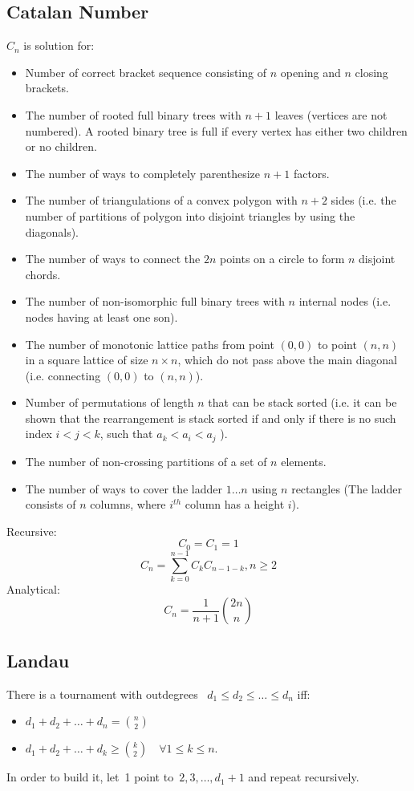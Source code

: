 \subsection{Catalan Number}
$C_n$ is solution for:
\begin{itemize}
	\item Number of correct bracket sequence consisting of $n$ opening and $n$ closing brackets.
	\item The number of rooted full binary trees with $n+1$ leaves (vertices are not numbered). A rooted binary tree is full if every vertex has either two children or no children.
	\item The number of ways to completely parenthesize $n+1$ factors.
	\item The number of triangulations of a convex polygon with $n+2$ sides (i.e. the number of partitions of polygon into disjoint triangles by using the diagonals).
	\item The number of ways to connect the $2n$ points on a circle to form $n$ disjoint chords.
	\item The number of non-isomorphic full binary trees with $n$ internal nodes (i.e. nodes having at least one son).
	\item The number of monotonic lattice paths from point $(0,0)$ to point $(n,n)$ in a square lattice of size $n×n$, which do not pass above the main diagonal (i.e. connecting $(0,0)$ to $(n,n)$).
	\item Number of permutations of length $n$ that can be stack sorted (i.e. it can be shown that the rearrangement is stack sorted if and only if there is no such index $i<j<k$, such that $a_k<a_i<a_j$ ).
	\item The number of non-crossing partitions of a set of $n$ elements.
	\item The number of ways to cover the ladder $1\dots n$ using $n$ rectangles (The ladder consists of $n$ columns, where $i^{th}$ column has a height $i$).
\end{itemize}
Recursive: \[C_0=C_1=1\] \[C_n= \sum_{k=0}^{n-1}C_kC_{n-1-k}, n\geq2\]
Analytical: \[C_n=\frac{1}{n+1}{2n \choose n}\]

\subsection{Landau}
There is a tournament with outdegrees ~$d_1 \leq d_2 \leq \ldots \leq d_n$ iff:
\begin{itemize}
\item $d_1 + d_2 + \ldots + d_n = {n \choose 2}$
\item $d_1 + d_2 + \ldots + d_k \geq {k \choose 2} \quad \forall 1 \leq k \leq n.$
\end{itemize}
In order to build it, let~1 point to~$2, 3, \ldots, d_1 + 1$ and repeat recursively.

